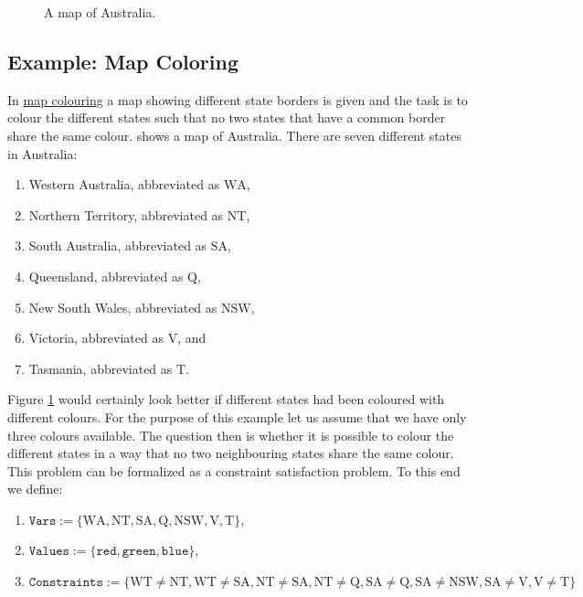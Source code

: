 \begin{figure}[!ht]
  \centering
  \caption{A map of Australia.}
  \label{fig:australia.pdf}
\end{figure}

\subsection{Example: Map Coloring}
In \href{https://en.wikipedia.org/wiki/Four_color_theorem}{map colouring} a map showing different state
borders is given and the task is to colour the different states such that no two states that have a common
border share the same colour.   shows a map of Australia.  There are seven different
states in Australia:
\begin{enumerate}
\item Western Australia, abbreviated as $\mathrm{WA}$,
\item Northern Territory, abbreviated as $\mathrm{NT}$,
\item South Australia, abbreviated as $\mathrm{SA}$,
\item Queensland, abbreviated as $\mathrm{Q}$,
\item New South Wales, abbreviated as $\mathrm{NSW}$,
\item Victoria, abbreviated as $\mathrm{V}$, and
\item Tasmania, abbreviated as $\mathrm{T}$.
\end{enumerate}
Figure \ref{fig:australia.pdf} would certainly look better if different states had been coloured with different
colours.  For the purpose of 
this example let us assume that we have only three colours available.  The question then is whether it is 
possible to colour the different states in a way that no two neighbouring states share the same colour.  This
problem can be formalized as a constraint satisfaction problem.  To this end we define:
\begin{enumerate}
\item $\mathtt{Vars} := \{ \mathrm{WA}, \mathrm{NT}, \mathrm{SA}, \mathrm{Q}, \mathrm{NSW}, \mathrm{V}, \mathrm{T} \}$,
\item $\mathtt{Values} := \{ \mathtt{red}, \mathtt{green}, \mathtt{blue} \}$,
\item $\mathtt{Constraints} := 
         \bigl\{ \mathrm{WT} \not= \mathrm{NT}, \mathrm{WT} \not= \mathrm{SA},
                 \mathrm{NT} \not= \mathrm{SA}, \mathrm{NT} \not= \mathrm{Q},
                 \mathrm{SA} \not= \mathrm{Q}, \mathrm{SA} \not= \mathrm{NSW}, \mathrm{SA} \not= \mathrm{V}, 
                 \mathrm{V} \not = \mathrm{T}
         \bigr\}
        $
\end{enumerate}

